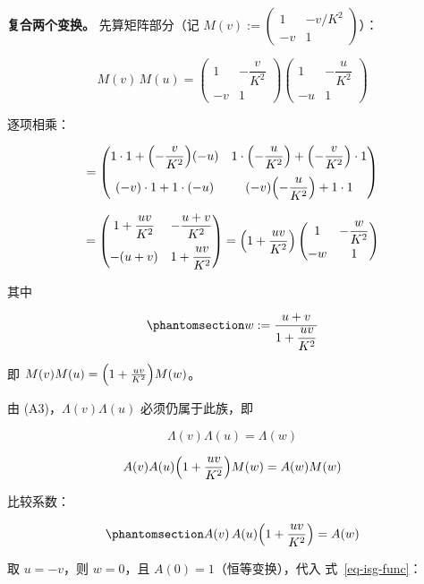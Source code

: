 \documentclass[
  chinese,
  a4paper,
  UTF8,
  12pt,
  oneside,
  openany]{ctexbook}
\theoremstyle{plain}
\theoremstyle{plain}
\theoremstyle{plain}
\theoremstyle{definition}
\theoremstyle{plain}
\theoremstyle{plain}
\theoremstyle{remark}
\begin{document}
\textbf{复合两个变换。} 先算矩阵部分（记
\(M(v):=\begin{pmatrix}1&-v/K^{2}\\-v&1\end{pmatrix}\)）：

\[
M(v)\,M(u)=
\begin{pmatrix}
1 & -\dfrac{v}{K^{2}}\\[4pt]
-v & 1
\end{pmatrix}
\begin{pmatrix}
1 & -\dfrac{u}{K^{2}}\\[4pt]
-u & 1
\end{pmatrix}
\]

逐项相乘：

\[
=\begin{pmatrix}
1\cdot1+\Bigl(-\dfrac{v}{K^{2}}\Bigr)(-u) &
1\cdot\Bigl(-\dfrac{u}{K^{2}}\Bigr)+\Bigl(-\dfrac{v}{K^{2}}\Bigr)\cdot1\\[10pt]
(-v)\cdot1+1\cdot(-u) &
(-v)\Bigl(-\dfrac{u}{K^{2}}\Bigr)+1\cdot1
\end{pmatrix}
\]

\[
=\begin{pmatrix}
1+\dfrac{uv}{K^{2}} &
-\dfrac{u+v}{K^{2}}\\[10pt]
-(u+v) &
1+\dfrac{uv}{K^{2}}
\end{pmatrix}
=\Bigl(1+\frac{uv}{K^{2}}\Bigr)
\begin{pmatrix}
1 & -\dfrac{w}{K^{2}}\\[6pt]
-w & 1
\end{pmatrix}
\]

其中

\begin{equation}\protect\phantomsection\label{eq-isg-w}{
w:=\frac{u+v}{1+\dfrac{uv}{K^{2}}}
}\end{equation}

即 \(M(v)M(u)=\Bigl(1+\frac{uv}{K^{2}}\Bigr)M(w)\)。

由 (A3)，\(\Lambda(v)\Lambda(u)\) 必须仍属于此族，即

\[
\Lambda(v)\Lambda(u)=\Lambda(w)
\]

\[
A(v)A(u)\Bigl(1+\frac{uv}{K^{2}}\Bigr)M(w)=A(w)M(w)
\]

比较系数：

\begin{equation}\protect\phantomsection\label{eq-isg-func}{
A(v)\,A(u)\Bigl(1+\frac{uv}{K^{2}}\Bigr)=A(w)
}\end{equation}

取 \(u=-v\)，则 \(w=0\)，且 \(A(0)=1\)（恒等变换），代入
式~\ref{eq-isg-func}：
\end{document}
